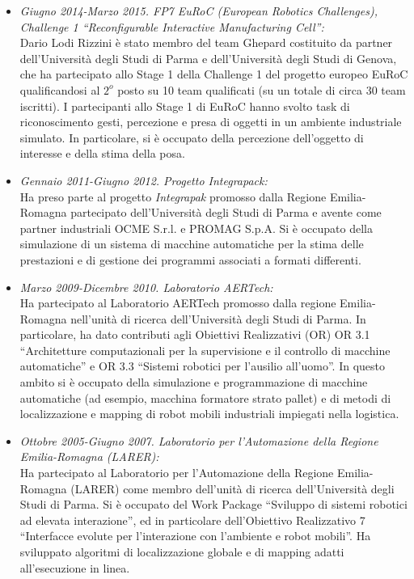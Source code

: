 \documentclass[11pt]{article}
\newcommand{\ITEMDATE}[1]{\item \textit{#1:}\\}
\begin{document}
\begin{itemize}
\begin{itemize}
\ITEMDATE{Giugno 2014-Marzo 2015. FP7 EuRoC (European Robotics Challenges), \\
           Challenge 1 ``Reconfigurable Interactive Manufacturing Cell''} 
Dario Lodi Rizzini \`e stato membro del team Ghepard costituito da partner dell'Universit\`a degli 
Studi di Parma e dell'Universit\`a degli Studi di Genova, che ha partecipato allo Stage 1 della 
Challenge 1 del progetto europeo EuRoC qualificandosi al $2^o$ posto su 10 team qualificati 
(su un totale di circa 30 team iscritti).
I partecipanti allo Stage 1 di EuRoC hanno svolto task di riconoscimento gesti, percezione e presa 
di oggetti in un ambiente industriale simulato. 
In particolare, si \`e occupato della percezione dell'oggetto di interesse e della stima della posa.

\ITEMDATE{Gennaio 2011-Giugno 2012. Progetto Integrapack} 
Ha preso parte al progetto \emph{Integrapak} promosso dalla Regione Emilia-Romagna partecipato 
dell'Universit\`a degli Studi di Parma
e avente come partner industriali OCME S.r.l. e PROMAG S.p.A.
Si \`e occupato della simulazione di un sistema di macchine automatiche per la stima delle prestazioni
e di gestione dei programmi associati a formati differenti. 

\ITEMDATE{Marzo 2009-Dicembre 2010. Laboratorio AERTech}
Ha partecipato al Laboratorio AERTech promosso dalla regione Emilia-Romagna nell'unit\`a di ricerca
dell'Universit\`a degli Studi di Parma.
In particolare, ha dato contributi agli Obiettivi Realizzativi (OR)
OR 3.1 ``Architetture computazionali per la supervisione e il controllo di macchine automatiche'' e
OR 3.3 ``Sistemi robotici per l'ausilio all'uomo''.
In questo ambito si \`e occupato della simulazione e programmazione di macchine automatiche 
(ad esempio, macchina formatore strato pallet) e di metodi di localizzazione e mapping 
di robot mobili industriali impiegati nella logistica. 

\ITEMDATE{Ottobre 2005-Giugno 2007. Laboratorio per l'Automazione della Regione Emilia-Romagna (LARER)}
Ha partecipato al Laboratorio per l'Automazione della Regione Emilia-Romagna (LARER) 
come membro dell'unit\`a di ricerca dell'Universit\`a degli Studi di Parma.
Si \`e occupato del Work Package ``Sviluppo di sistemi robotici ad elevata interazione'',
ed in particolare dell'Obiettivo Realizzativo 7 ``Interfacce evolute per l'interazione con l'ambiente e robot mobili''.
Ha sviluppato algoritmi di localizzazione globale e di mapping adatti all'esecuzione in linea.

\end{itemize}


\end{itemize}
\end{document}
